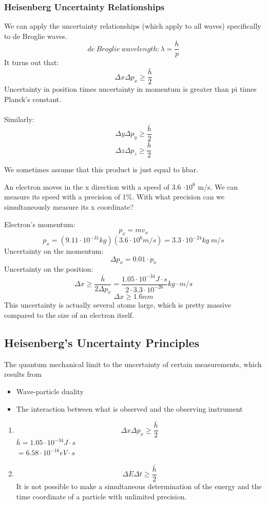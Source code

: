 \documentclass[class=article,crop=false]{standalone}
\begin{document}
\subsubsection{Heisenberg Uncertainty Relationships}
We can apply the uncertainty relationships (which apply to all waves) specifically to de Broglie waves.
$$ de\ Broglie\ wavelength: \lambda = \frac{h}{p} $$
It turns out that:
$$ \Delta x \Delta p_x \geq \frac{\bar{h}}{2} $$
Uncertainty in position times uncertainty in momentum is greater than pi times Planck's constant.\\
\\

Similarly:
$$ \Delta y \Delta p_y \geq \frac{\bar{h}}{2} $$
$$ \Delta z \Delta p_z \geq \frac{\bar{h}}{2} $$

We sometimes assume that this product is just equal to hbar.

\newpage
\begin{question}
	An electron moves in the x direction with a speed of 3.6 $\cdot 10^6$ m/s. We can measure its speed with a precision of 1\%. With what precision can we simultaneously measure its x coordinate?
	\begin{answer}[Answer]
		Electron's momentum:
		$$ p_x = mv_x $$
		$$p_x = (9.11 \cdot 10^{-31} kg)(3.6 \cdot 10^6 m/s) = 3.3 \cdot 10^{-24} kg\ m/s $$
		Uncertainty on the momentum:
		$$ \Delta p_x = 0.01 \cdot p_x $$
		Uncertainty on the position:
		$$ \Delta x \geq \frac{\bar{h}}{2\Delta p_x} = \frac{1.05 \cdot 10^{-34} J \cdot s}{2 \cdot 3.3 \cdot 10^{-26}} kg \cdot m/s $$
		$$ \Delta x \geq 1.6 nm $$
		This uncertainty is actually several atoms large, which is pretty massive compared to the size of an electron itself.
	\end{answer}
\end{question}

\subsection{Heisenberg's Uncertainty Principles}
The quantum mechanical limit to the uncertainty of certain measurements, which results from
\begin{itemize}
	\item Wave-particle duality
	\item The interaction between what is observed and the observing instrument
\end{itemize}

\begin{result}
	\begin{enumerate}
		\item
	\[ \Delta x \Delta p_x \geq \frac{\bar{h}}{2} \]
	$\bar{h} = 1.05 \cdot 10^{-34} J\cdot s $ \\
	$ = 6.58 \cdot 10^{-16} eV \cdot s$
		\item
	$$\Delta E \Delta t \geq \frac{\bar{h}}{2} $$
	It is not possible to make a simultaneous determination of the energy and the time coordinate of a particle with unlimited precision.
	\end{enumerate}
\end{result}
\end{document}
